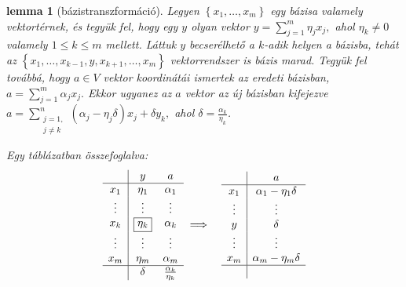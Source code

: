 \documentclass[9pt, a4paper, showtrims]{memoir}
\theoremstyle{plain}
\newtheorem{lemma}[proposition]{lemma}
\theoremstyle{remark}
\theoremstyle{definition}
\begin{document}
\begin{lemma}[bázistranszformáció]\label{le:bazistrafo}
	Legyen $\left\{ x_1,\ldots,x_m \right\}$ egy bázisa valamely vektortérnek,
	és tegyük fel,
	hogy egy $y$ olyan vektor
	\(
	y=\sum_{j=1}^m\eta_jx_j,
	\)
	ahol $\eta_k\neq 0$ valamely $1\leq k\leq m$ mellett.
	Láttuk $y$ becserélhető a $k$-adik helyen a bázisba,
	tehát az
	\(
	\left\{ x_1,\ldots,x_{k-1},y,x_{k+1},\ldots,x_m \right\}
	\)
	vektorrendszer is bázis marad.
	Tegyük fel továbbá, hogy $a\in V$ vektor koordinátái ismertek az eredeti bázisban,
	\(
	a=
	\sum_{j=1}^m\alpha_j x_j.
	\)
	Ekkor ugyanez az $a$ vektor az új bázisban kifejezve
	\(
	a=
	\sum_{\substack{j=1,\\j\neq k}}^n\left( \alpha_j-\eta_j\delta \right)x_j
	+\delta y_k,
	\)
	ahol $\delta=\frac{\alpha_k}{\eta_k}$.

	Egy táblázatban összefoglalva:
	\begin{eqnarray}\label{alg:bazistrafo}
		\begin{array}{c|cc}
			       & y              & a                       \\
			\hline
			x_1    & \eta_1         & \alpha_1                \\
			\vdots & \vdots         & \vdots                  \\
			x_k    & \boxed{\eta_k} & \alpha_k                \\
			\vdots & \vdots         & \vdots                  \\
			x_m    & \eta_m         & \alpha_m                \\
			\hline
			       & \delta         & \frac{\alpha_k}{\eta_k}
		\end{array}
		&\implies&
		\begin{array}{c|c}
			                 & a                     \\
			\hline
			x_1              & \alpha_1-\eta_1\delta \\
			\vdots           & \vdots                \\
			y                & \delta                \\
			\vdots           & \vdots                \\
			x_m              & \alpha_m-\eta_m\delta \\
			\hline
			\phantom{\delta} &
		\end{array}
	\end{eqnarray}
\end{lemma}


\end{document}
